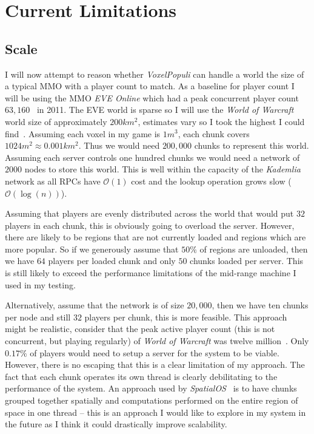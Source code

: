 \documentclass[12pt,notitlepage,a4paper]{report}
\newcommand{\kademlia}{\emph{Kademlia}}
\newcommand{\voxpop}{\emph{VoxelPopuli}}
\begin{document}
	\section{Current Limitations}
	\label{sec:limits}
	\subsection{Scale}
	I will now attempt to reason whether \voxpop{} can handle a world the size of a typical MMO with a player count to match. As a baseline for player count I will be using the MMO \emph{EVE Online} which had a peak concurrent player count $63,160$~\cite{eve} in 2011. The EVE world is sparse so I will use the \emph{World of Warcraft} world size of approximately $200km^2$, estimates vary so I took the highest I could find~\cite{wowsize}. Assuming each voxel in my game is $1m^3$, each chunk covers $1024m^2 \approx 0.001km^2$. Thus we would need $200,000$ chunks to represent this world. Assuming each server controls one hundred chunks we would need a network of $2000$ nodes to store this world. This is well within the capacity of the \kademlia{} network as all RPCs have $\mathcal{O}(1)$ cost and the lookup operation grows slow ($\mathcal{O}(\log(n))$).
	
	Assuming that players are evenly distributed across the world that would put $32$ players in each chunk, this is obviously going to overload the server. However, there are likely to be regions that are not currently loaded and regions which are more popular. So if we generously assume that $50\%$ of regions are unloaded, then we have $64$ players per loaded chunk and only $50$ chunks loaded per server. This is still likely to exceed the performance limitations of the mid-range machine I used in my testing.
	
	Alternatively, assume that the network is of size $20,000$, then we have ten chunks per node and still $32$ players per chunk, this is more feasible. This approach might be realistic, consider that the peak active player count (this is not concurrent, but playing regularly) of \emph{World of Warcraft} was twelve million~\cite{wowbig}. Only $0.17\%$ of players would need to setup a server for the system to be viable. However, there is no escaping that this is a clear limitation of my approach. The fact that each chunk operates its own thread is clearly debilitating to the performance of the system. An approach used by \emph{SpatialOS}~\cite{SpatialOS} is to have chunks grouped together spatially and computations performed on the entire region of space in one thread -- this is an approach I would like to explore in my system in the future as I think it could drastically improve scalability.
	
\end{document}
